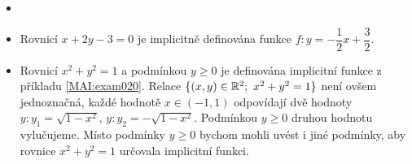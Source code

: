 \begin{mdframed}[style=mdexam]
  \begin{example}\label{MAI:exam022}
    \begin{itemize}
    \item[]
    \item  Rovnicí $x+2y-3=0$ je implicitně definována funkce  
          $f:y=-\dfrac{1}{2}x+\dfrac{3}{2}$.
    \item  Rovnicí $x^2+y^2=1$ a podmínkou $y\geq0$ je definována implicitní funkce z příkladu 
          \ref{MAI:exam020}. Relace $\{(x,y)\in\mathbb{R}^2;\ x^2+y^2=1\}$ není ovšem jednoznačná, 
          každé hodnotě $x\in(-1,1)$ odpovídají dvě hodnoty $y: y_1=\sqrt{1-x^2}$, $y: y_2 = 
          -\sqrt{1-x^2}$. Podmínkou $y\geq0$ druhou hodnotu vylučujeme. Místo podmínky $y\geq0$ 
          bychom mohli uvést i jiné podmínky, aby rovnice $x^2+y^2=1$ určovala implicitní funkci.   
    \end{itemize}
  \end{example}
\end{mdframed}